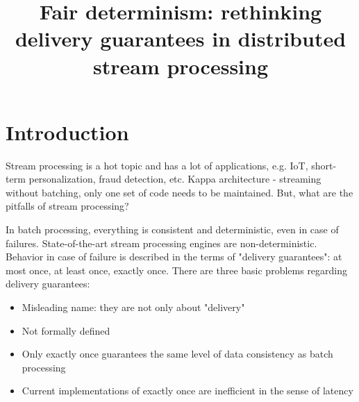 \documentclass[sigconf]{acmart}
\theoremstyle{remark}
\begin{document}
\title {Fair determinism: rethinking delivery guarantees in distributed stream processing}



\maketitle

\section {Introduction}

Stream processing is a hot topic and has a lot of applications, e.g. IoT, short-term personalization, fraud detection, etc. Kappa architecture - streaming without batching, only one set of code needs to be maintained. But, what are the pitfalls of stream processing?

In batch processing, everything is consistent and deterministic, even in case of failures. State-of-the-art stream processing engines are non-deterministic. Behavior in case of failure is described in the terms of "delivery guarantees": at most once, at least once, exactly once. There are three basic problems regarding delivery guarantees: 
\begin{itemize}
    \item Misleading name: they are not only about "delivery"
    \item Not formally defined
    \item Only exactly once guarantees the same level of data consistency as batch processing 
    \item Current implementations of exactly once are inefficient in the sense of latency
\end{itemize}
\end{document}
